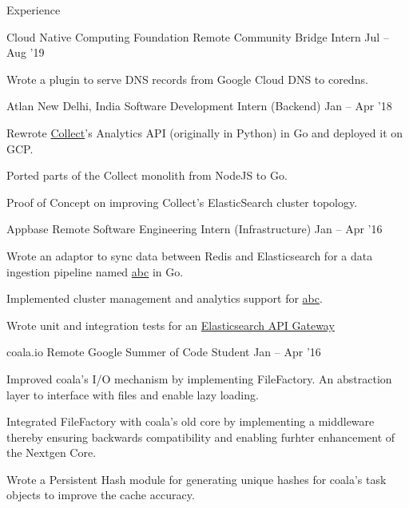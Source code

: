 \documentclass{resume} %
\begin{document}
\begin{rSection}{Experience}
  \begin{rWorkSection}{Cloud Native Computing Foundation}
                      {Remote}
                      {Community Bridge Intern}
                      {Jul -- Aug '19}
  {
    \item Wrote a plugin to serve DNS records from Google Cloud DNS to coredns.
  }
  \end{rWorkSection}

  \begin{rWorkSection}{Atlan}
                     {New Delhi, India}
                     {Software Development Intern (Backend)}
                     {Jan -- Apr '18}
  {
    \item Rewrote \href{https://collect.atlan.com/}{Collect}'s Analytics API (originally in Python) in Go and deployed it on GCP.
    \item Ported parts of the Collect monolith from NodeJS to Go.
    \item Proof of Concept on improving Collect's ElasticSearch cluster topology.
  }
  \end{rWorkSection}

  \begin{rWorkSection}{Appbase}
                     {Remote}
                     {Software Engineering Intern (Infrastructure)}
                     {Jan -- Apr '16}
  {
    \item Wrote an adaptor to sync data between Redis and Elasticsearch for a data ingestion pipeline named \href{http://github.com/appbaseio/abc/}{abc} in Go.
    \item Implemented cluster management and analytics support for \href{http://github.com/appbaseio/abc/}{abc}.
    \item Wrote unit and integration tests for an \href{https://github.com/appbaseio/arc}{Elasticsearch API Gateway}
  }
  \end{rWorkSection}
  
  \begin{rWorkSection}{coala.io}
                     {Remote}
                     {Google Summer of Code Student}
                     {Jan -- Apr '16}
  {
    \item Improved coala's I/O mechanism by implementing FileFactory. An abstraction layer to interface with files and enable lazy loading.
    \item Integrated FileFactory with coala's old core by implementing a middleware thereby ensuring backwards compatibility and enabling furhter enhancement of the Nextgen Core.
    \item Wrote a Persistent Hash module for generating unique hashes for coala's task objects to improve the cache accuracy.
  }
  \end{rWorkSection}
\end{rSection}
\end{document}
